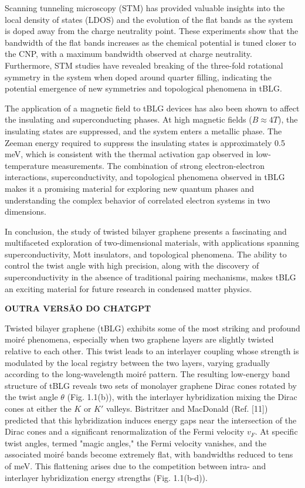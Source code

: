 Scanning tunneling microscopy (STM) has provided valuable insights into the local density of states (LDOS) and the evolution of the flat bands as the system is doped away from the charge neutrality point. These experiments show that the bandwidth of the flat bands increases as the chemical potential is tuned closer to the CNP, with a maximum bandwidth observed at charge neutrality. Furthermore, STM studies have revealed breaking of the three-fold rotational symmetry in the system when doped around quarter filling, indicating the potential emergence of new symmetries and topological phenomena in tBLG.

The application of a magnetic field to tBLG devices has also been shown to affect the insulating and superconducting phases. At high magnetic fields (\(B \approx 4T\)), the insulating states are suppressed, and the system enters a metallic phase. The Zeeman energy required to suppress the insulating states is approximately 0.5 meV, which is consistent with the thermal activation gap observed in low-temperature measurements. The combination of strong electron-electron interactions, superconductivity, and topological phenomena observed in tBLG makes it a promising material for exploring new quantum phases and understanding the complex behavior of correlated electron systems in two dimensions.

In conclusion, the study of twisted bilayer graphene presents a fascinating and multifaceted exploration of two-dimensional materials, with applications spanning superconductivity, Mott insulators, and topological phenomena. The ability to control the twist angle with high precision, along with the discovery of superconductivity in the absence of traditional pairing mechanisms, makes tBLG an exciting material for future research in condensed matter physics.

\n
\textbf{OUTRA VERSÃO DO CHATGPT}
\n

Twisted bilayer graphene (tBLG) exhibits some of the most striking and profound moiré phenomena, especially when two graphene layers are slightly twisted relative to each other. This twist leads to an interlayer coupling whose strength is modulated by the local registry between the two layers, varying gradually according to the long-wavelength moiré pattern. The resulting low-energy band structure of tBLG reveals two sets of monolayer graphene Dirac cones rotated by the twist angle \(\theta\) (Fig. 1.1(b)), with the interlayer hybridization mixing the Dirac cones at either the \(K\) or \(K'\) valleys. Bistritzer and MacDonald (Ref. [11]) predicted that this hybridization induces energy gaps near the intersection of the Dirac cones and a significant renormalization of the Fermi velocity \(v_F\). At specific twist angles, termed "magic angles," the Fermi velocity vanishes, and the associated moiré bands become extremely flat, with bandwidths reduced to tens of meV. This flattening arises due to the competition between intra- and interlayer hybridization energy strengths (Fig. 1.1(b-d)).

